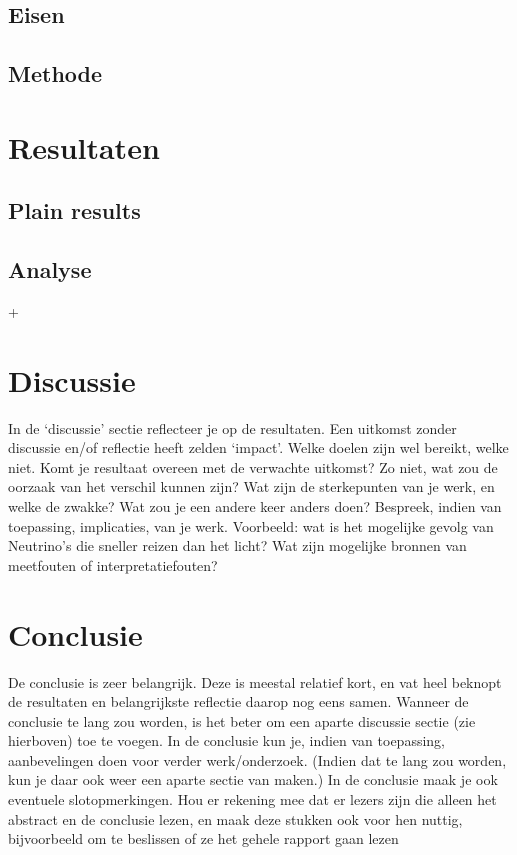 \documentclass{report}
\begin{document}
\section{Eisen}


\section{Methode}


\chapter{Resultaten}

\section{Plain results}



\section{Analyse}+
\chapter {Discussie}
In de ‘discussie’ sectie reﬂecteer je op de resultaten. Een uitkomst zonder discussie en/of reﬂectie
heeft zelden ‘impact’. Welke doelen zijn wel bereikt, welke niet. Komt je resultaat overeen met de
verwachte uitkomst? Zo niet, wat zou de oorzaak van het verschil kunnen zijn? Wat zijn de sterkepunten van je werk, en welke de zwakke? Wat zou je een andere keer anders doen? Bespreek, indien
van toepassing, implicaties, van je werk. Voorbeeld: wat is het mogelijke gevolg van Neutrino’s die
sneller reizen dan het licht? Wat zijn mogelijke bronnen van meetfouten of interpretatiefouten?

\chapter{Conclusie}
De conclusie is zeer belangrijk. Deze is meestal relatief kort, en vat heel beknopt de resultaten en
belangrijkste reﬂectie daarop nog eens samen. Wanneer de conclusie te lang zou worden, is het beter
om een aparte discussie sectie (zie hierboven) toe te voegen. In de conclusie kun je, indien van
toepassing, aanbevelingen doen voor verder werk/onderzoek. (Indien dat te lang zou worden, kun je
daar ook weer een aparte sectie van maken.) In de conclusie maak je ook eventuele slotopmerkingen.
Hou er rekening mee dat er lezers zijn die alleen het abstract en de conclusie lezen, en maak deze
stukken ook voor hen nuttig, bijvoorbeeld om te beslissen of ze het gehele rapport gaan lezen
\end{document}
